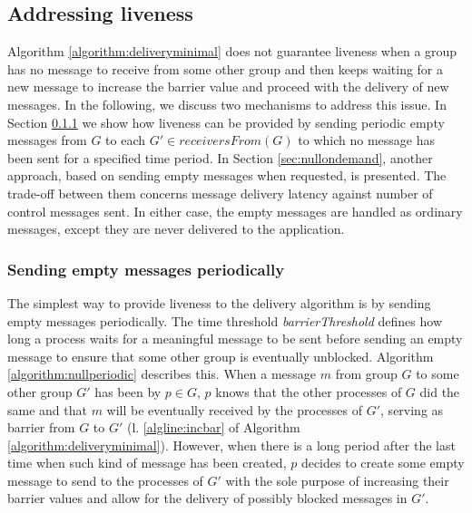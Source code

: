 \documentclass[times, 10pt]{article}
\begin{document}
\subsection{Addressing liveness}
\label{sec:liveness}

Algorithm \ref{algorithm:deliveryminimal} does not guarantee liveness when a group has no message to receive from some other group and then keeps waiting for a new message to increase the barrier value and proceed with the delivery of new messages. In the following, we discuss two mechanisms to address this issue. In Section \ref{sec:nullperiodic} we show how liveness can be  provided by sending periodic empty messages from $G$ to each $G' \in receiversFrom(G)$ to which no message has been sent for a specified time period. In Section \ref{sec:nullondemand}, another approach, based on sending empty messages when requested, is presented. The trade-off between them concerns message delivery latency against number of control messages sent. In either case, the empty messages are handled as ordinary messages, except they are never delivered to the application.



\subsubsection{Sending empty messages periodically}
\label{sec:nullperiodic}

The simplest way to provide liveness to the delivery algorithm is by sending empty messages periodically. The time threshold \textit{barrierThreshold} defines how long a process waits for a meaningful message to be sent before sending an empty message to ensure that some other group is eventually unblocked. Algorithm \ref{algorithm:nullperiodic} describes this. When a message $m$ from group $G$ to some other group $G'$ has been \rmcast{} by $p \in G$, $p$ knows that the other processes of $G$ did the same and that $m$ will be eventually received by the processes of $G'$, serving as barrier from $G$ to $G'$ (l. \ref{algline:incbar} of Algorithm \ref{algorithm:deliveryminimal}). However, when there is a long period after the last time when such kind of message has been created, $p$ decides to create some empty message to send to the processes of $G'$ with the sole purpose of increasing their barrier values and allow for the delivery of possibly blocked messages in $G'$.
\end{document}
